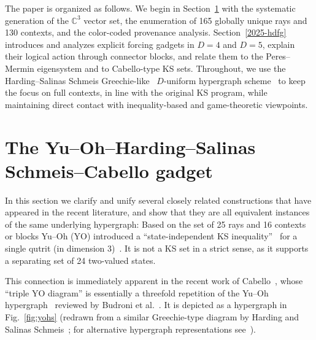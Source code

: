 \documentclass[%
  reprint,
  superscriptaddress,
  showpacs,
  showkeys,
  amsmath,amssymb,
  pra,
  longbibliography,
  floatfix,
  x11names
]{revtex4-2}
\begin{document}
The paper is organized as follows. We begin in Section~\ref{2025-yohscg} with the systematic generation
of the $\mathbb{C}^3$ vector set,
the enumeration of 165 globally unique rays and 130 contexts, and the color-coded provenance analysis.
Section~\ref{2025-hdfg}  introduces and analyzes explicit forcing gadgets in $D=4$ and $D=5$,
explain their logical action through connector blocks, and relate them to the Peres--Mermin eigensystem and to Cabello-type KS sets.
Throughout, we use the Harding--Salinas Schmeis Greechie-like~\cite{greechie:71} $D$-uniform hypergraph scheme~\cite{harding2025remarksIJTP}
to keep the focus on full contexts, in line with the original KS program,
while maintaining direct contact with inequality-based and game-theoretic viewpoints.


\section{The Yu--Oh--Harding--Salinas Schmeis--Cabello gadget}
\label{2025-yohscg}


In this section we clarify and unify several closely related constructions that have appeared in the recent literature, and
show that they are all equivalent instances of the same underlying hypergraph:
Based on the set of 25 rays and 16 contexts or blocks  Yu--Oh (YO) introduced
a ``state-independent KS inequality''~\cite{PhysRevLett.103.050401,Yu2015}
for a single qutrit (in dimension 3)~\cite{Yu-2012}.
It is not a KS set in a strict sense, as it supports a separating set of 24 two-valued states.



This connection is immediately apparent in the recent work of Cabello~\cite{Cabello2025},
whose ``triple YO diagram'' is essentially a threefold repetition of the Yu--Oh hypergraph~\cite{Yu-2012}
reviewed by Budroni et al.~\cite[Fig.~7]{cabello2021contextuality}.
It is depicted as a hypergraph in Fig.~\ref{fig:yohs} (redrawn from a similar Greechie-type diagram by Harding and Salinas Schmeis~\cite[Fig.~2]{harding2025remarksIJTP};
for alternative hypergraph representations see~\cite{svozil-2025-color}).
\end{document}

